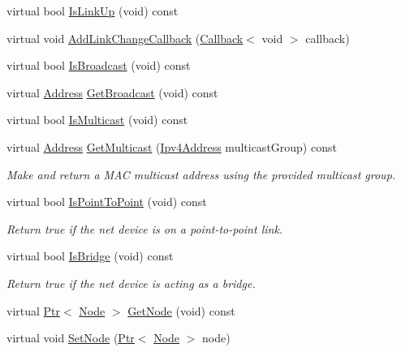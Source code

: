 \begin{DoxyCompactItemize}
\item 
virtual bool \hyperlink{classns3_1_1WaveNetDevice_aad4371d5d6d230831987abb70761d884}{Is\+Link\+Up} (void) const 
\item 
virtual void \hyperlink{classns3_1_1WaveNetDevice_af696e94be87ffb340a674ebc7d2f94ef}{Add\+Link\+Change\+Callback} (\hyperlink{classns3_1_1Callback}{Callback}$<$ void $>$ callback)
\item 
virtual bool \hyperlink{classns3_1_1WaveNetDevice_a55e7c9d97a0180848f54e00183a8c525}{Is\+Broadcast} (void) const 
\item 
virtual \hyperlink{classns3_1_1Address}{Address} \hyperlink{classns3_1_1WaveNetDevice_a3c5e95f7277d8171bbf35c874f65bc72}{Get\+Broadcast} (void) const 
\item 
virtual bool \hyperlink{classns3_1_1WaveNetDevice_ace71bad15150f78178e331411b1bc1c3}{Is\+Multicast} (void) const 
\item 
virtual \hyperlink{classns3_1_1Address}{Address} \hyperlink{classns3_1_1WaveNetDevice_a8a27d37eafa4779d268682099205f473}{Get\+Multicast} (\hyperlink{classns3_1_1Ipv4Address}{Ipv4\+Address} multicast\+Group) const 
\begin{DoxyCompactList}\small\item\em Make and return a M\+AC multicast address using the provided multicast group. \end{DoxyCompactList}\item 
virtual bool \hyperlink{classns3_1_1WaveNetDevice_a6eafd8ea02f3cfeb991696a0da0d342b}{Is\+Point\+To\+Point} (void) const 
\begin{DoxyCompactList}\small\item\em Return true if the net device is on a point-\/to-\/point link. \end{DoxyCompactList}\item 
virtual bool \hyperlink{classns3_1_1WaveNetDevice_a2a90f57199efb01997d57a944691f8f1}{Is\+Bridge} (void) const 
\begin{DoxyCompactList}\small\item\em Return true if the net device is acting as a bridge. \end{DoxyCompactList}\item 
virtual \hyperlink{classns3_1_1Ptr}{Ptr}$<$ \hyperlink{classns3_1_1Node}{Node} $>$ \hyperlink{classns3_1_1WaveNetDevice_ad3bcbda618cb6c6b9a9ceb7d7cae0924}{Get\+Node} (void) const 
\item 
virtual void \hyperlink{classns3_1_1WaveNetDevice_a064907223dfd3ccead8b187d21b36699}{Set\+Node} (\hyperlink{classns3_1_1Ptr}{Ptr}$<$ \hyperlink{classns3_1_1Node}{Node} $>$ node)

\end{DoxyCompactItemize}
